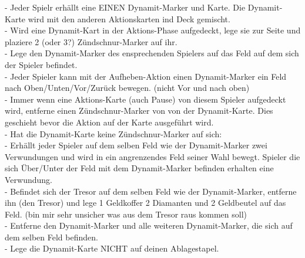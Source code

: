 - Jeder Spielr erhällt eine EINEN Dynamit-Marker und Karte. Die Dynamit-Karte wird mit den anderen Aktionskarten ind Deck
  gemischt.
\\
- Wird eine Dynamit-Kart in der Aktions-Phase aufgedeckt, lege sie zur Seite und plaziere 2 (oder 3?) Zündschnur-Marker auf ihr.
\\
- Lege den Dynamit-Marker des ensprechenden Spielers auf das Feld auf dem sich der Spieler befindet.
\\
- Jeder Spieler kann mit der Aufheben-Aktion einen Dynamit-Marker ein Feld nach Oben/Unten/Vor/Zurück bewegen.
  (nicht Vor und nach oben)
\\
- Immer wenn eine Aktions-Karte (auch Pause) von diesem Spieler aufgedeckt wird, entferne einen Zündschnur-Marker von
  von der Dynamit-Karte. Dies geschieht bevor die Aktion auf der Karte ausgeführt wird.
\\
- Hat die Dynamit-Karte keine Zündschnur-Marker auf sich:
\\
    - Erhällt jeder Spieler auf dem selben Feld wie der Dynamit-Marker zwei Verwundungen und wird in ein angrenzendes
      Feld seiner Wahl bewegt. Spieler die sich Über/Unter der Feld mit dem Dynamit-Marker befinden erhalten eine
      Verwundung.
\\
    - Befindet sich der Tresor auf dem selben Feld wie der Dynamit-Marker, entferne ihn (den Tresor) und lege 1 Geldkoffer
      2 Diamanten und 2 Geldbeutel auf das Feld. (bin mir sehr unsicher was aus dem Tresor raus kommen soll)
\\
    - Entferne den Dynamit-Marker und alle weiteren  Dynamit-Marker, die sich auf dem selben Feld befinden.
\\
    - Lege die Dynamit-Karte NICHT auf deinen Ablagestapel.